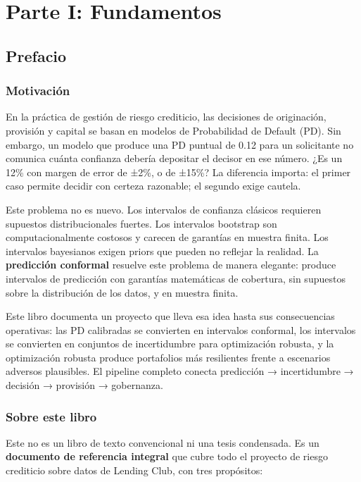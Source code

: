 \documentclass[
  spanish,
  11pt,
  letterpaper,
]{scrbook}
\theoremstyle{plain}
\theoremstyle{remark}
\begin{document}
\part{Parte I: Fundamentos}

\chapter{Prefacio}\label{prefacio}

\section{Motivación}\label{motivaciuxf3n}

En la práctica de gestión de riesgo crediticio, las decisiones de
originación, provisión y capital se basan en modelos de Probabilidad de
Default (PD). Sin embargo, un modelo que produce una PD puntual de 0.12
para un solicitante no comunica cuánta confianza debería depositar el
decisor en ese número. ¿Es un 12\% con margen de error de ±2\%, o de
±15\%? La diferencia importa: el primer caso permite decidir con certeza
razonable; el segundo exige cautela.

Este problema no es nuevo. Los intervalos de confianza clásicos
requieren supuestos distribucionales fuertes. Los intervalos bootstrap
son computacionalmente costosos y carecen de garantías en muestra
finita. Los intervalos bayesianos exigen priors que pueden no reflejar
la realidad. La \textbf{predicción conformal} resuelve este problema de
manera elegante: produce intervalos de predicción con garantías
matemáticas de cobertura, sin supuestos sobre la distribución de los
datos, y en muestra finita.

Este libro documenta un proyecto que lleva esa idea hasta sus
consecuencias operativas: las PD calibradas se convierten en intervalos
conformal, los intervalos se convierten en conjuntos de incertidumbre
para optimización robusta, y la optimización robusta produce portafolios
más resilientes frente a escenarios adversos plausibles. El pipeline
completo conecta predicción → incertidumbre → decisión → provisión →
gobernanza.

\section{Sobre este libro}\label{sobre-este-libro}

Este no es un libro de texto convencional ni una tesis condensada. Es un
\textbf{documento de referencia integral} que cubre todo el proyecto de
riesgo crediticio sobre datos de Lending Club, con tres propósitos:
\end{document}
